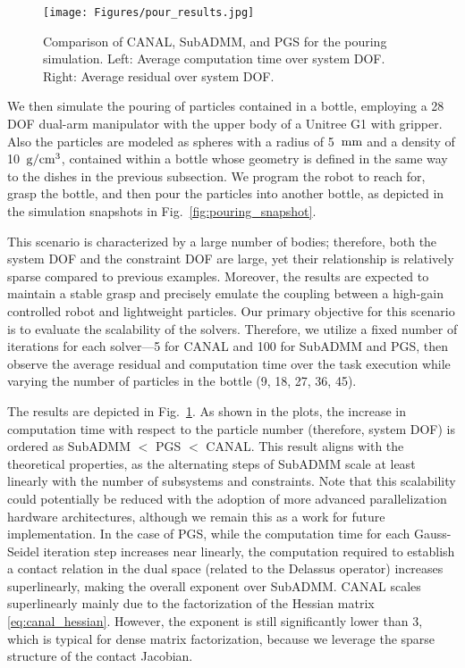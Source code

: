 \documentclass[lettersize,journal]{IEEEtran}
\begin{document}
\begin{figure}[t]
\centering
\texttt{[image: Figures/pour\_results.jpg]}
\caption{Comparison of CANAL, SubADMM, and PGS for the pouring simulation. Left: Average computation time over system DOF. Right: Average residual over system DOF.}
\label{fig:pouring_scalability}
\end{figure}

We then simulate the pouring of particles contained in a bottle, employing a 28 DOF dual-arm manipulator with the upper body of a Unitree G1 with gripper. 
Also the particles are modeled as spheres with a radius of 5~$\rm{mm}$ and a density of 10~$\rm{g}/\rm{cm}^3$, contained within a bottle whose geometry is defined in the same way to the dishes in the previous subsection. 
We program the robot to reach for, grasp the bottle, and then pour the particles into another bottle, as depicted in the simulation snapshots in Fig.~\ref{fig:pouring_snapshot}.

This scenario is characterized by a large number of bodies; therefore, both the system DOF and the constraint DOF are large, yet their relationship is relatively sparse compared to previous examples. 
Moreover, the results are expected to maintain a stable grasp and precisely emulate the coupling between a high-gain controlled robot and lightweight particles.
Our primary objective for this scenario is to evaluate the scalability of the solvers. Therefore, we utilize a fixed number of iterations for each solver—5 for CANAL and 100 for SubADMM and PGS, then observe the average residual and computation time over the task execution while varying the number of particles in the bottle (9, 18, 27, 36, 45).

The results are depicted in Fig.~\ref{fig:pouring_scalability}.
As shown in the plots, the increase in computation time with respect to the particle number (therefore, system DOF) is ordered as SubADMM $<$ PGS $<$ CANAL. 
This result aligns with the theoretical properties, as the alternating steps of SubADMM scale at least linearly with the number of subsystems and constraints. 
Note that this scalability could potentially be reduced with the adoption of more advanced parallelization hardware architectures, although we remain this as a work for future implementation.
In the case of PGS, while the computation time for each Gauss-Seidel iteration step increases near linearly, the computation required to establish a contact relation in the dual space (related to the Delassus operator) increases superlinearly, making the overall exponent over SubADMM.  
CANAL scales superlinearly mainly due to the factorization of the Hessian matrix \eqref{eq:canal_hessian}. However, the exponent is still significantly lower than $3$, which is typical for dense matrix factorization, because we leverage the sparse structure of the contact Jacobian.
\end{document}
